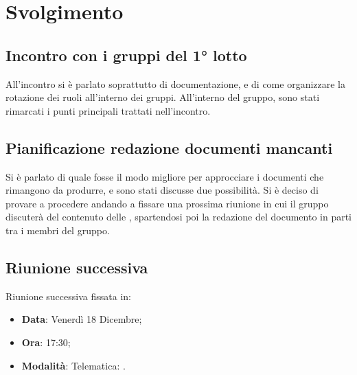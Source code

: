 \documentclass[]{article}
\begin{document}
	\newpage

	\section{Svolgimento}
		\subsection{Incontro con i gruppi del 1° lotto}
		All'incontro si è parlato soprattutto di documentazione, e di come organizzare la rotazione dei ruoli all'interno dei gruppi. All'interno del gruppo, sono stati rimarcati i punti principali trattati nell'incontro.\\

		\subsection{Pianificazione redazione documenti mancanti}
		Si è parlato di quale fosse il modo migliore per approcciare i documenti che rimangono da produrre, e sono stati discusse due possibilità.
		Si è deciso di provare a procedere andando a fissare una prossima riunione in cui il gruppo discuterà del contenuto delle , spartendosi poi la redazione del documento in parti tra i membri del gruppo.\\

		\subsection{Riunione successiva}
		Riunione successiva fissata in:
		\begin{itemize}
			\item \textbf{Data}: Venerdì 18 Dicembre;
			\item \textbf{Ora}: 17:30;
			\item \textbf{Modalità}: Telematica: .
		\end{itemize}
\end{document}
